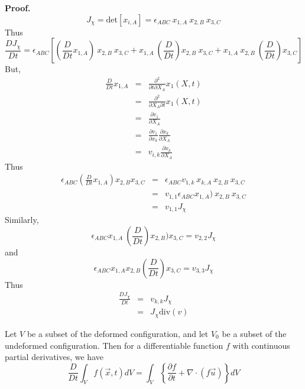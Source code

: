 \textbf{Proof.}
$$ J_{\chi} = \mbox{det}[x_{i,A}] = \epsilon_{ABC}\ x_{1,A}\ x_{2,B}\ x_{3,C} $$
Thus
$$ \frac{DJ_{\chi}}{Dt} = \epsilon_{ABC}[(\frac{D}{Dt}x_{1,A})\ x_{2,B}\ x_{3,C} + x_{1,A}\ (\frac{D}{Dt})x_{2,B}\ x_{3,C} + x_{1,A}\ x_{2,B}\ (\frac{D}{Dt})x_{3,C}]$$
But,
\begin{eqnarray*} \frac{D}{Dt}x_{1,A} &=& \frac{\partial^2}{\partial t \partial X_{A}}x_{1}(X,t)\\
&=& \frac{\partial^2}{\partial X_{A} \partial t }x_{1}(X,t)\\ 
&=& \frac{\partial v_{1}}{\partial X_{A}}\\
&=& \frac{\partial v_{1}}{\partial x_{k}} \frac{\partial x_{k}}{\partial X_{A}}\\
&=& v_{i,k} \frac{\partial x_{k}}{\partial X_{A}}
\end{eqnarray*}
Thus 
\begin{eqnarray*} \epsilon_{ABC}(\frac{D}{Dt}x_{1,A}) x_{2,B} x_{3,C} &=& \epsilon_{ABC}v_{1,k}\ x_{k,A}\ x_{2,B}\ x_{3,C}\\
&=& v_{1,1} \epsilon_{ABC}x_{1,A})\ x_{2,B}\ x_{3,C}\\
&=& v_{1,1}J_{\chi}
\end{eqnarray*}
Similarly, 
$$ \epsilon_{ABC} x_{1,A} \ (\frac{D}{Dt})x_{2,B}) x_{3,C} = v_{2,2}J_{\chi} $$
and
$$ \epsilon_{ABC} x_{1,A} x_{2,B} (\frac{D}{Dt})x_{3,C} = v_{3,3}J_{\chi} $$
Thus 
\begin{eqnarray*}\frac{DJ_{\chi}}{Dt} &=& v_{k,k}J_{\chi}\\ 
&=& J_{\chi}\mbox{div}(v)
\end{eqnarray*}




\begin{theo}
Let $V$ be a subset of the deformed configuration, and let $V_{0}$ be a subset of the undeformed configuration. Then for a differentiable function $f$ with continuous partial derivatives, we have
\begin{equation}
\frac{D}{Dt} \int_{V} f(\stackrel{\rightarrow}{x},t)dV = \int_{V}\left\{ {\frac{\partial f}{\partial t} + \nabla\cdot(f\stackrel{\rightarrow}{u})}\right\}dV
\end{equation}
\end{theo}

